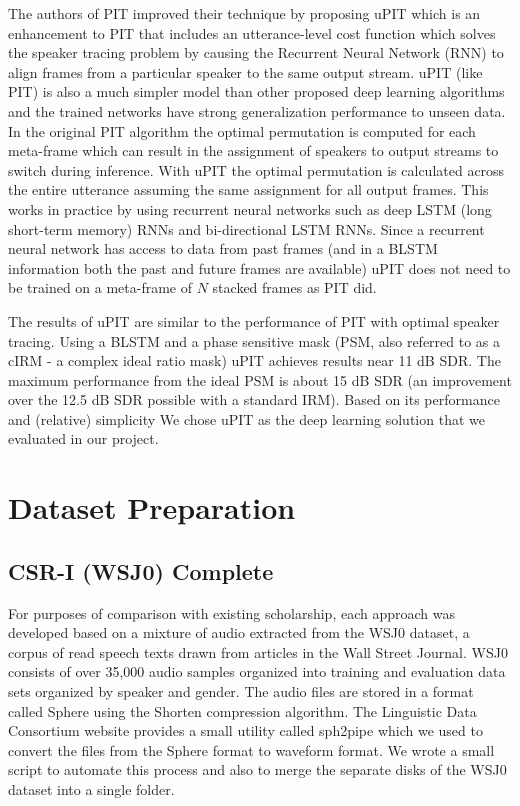 \documentclass[journal, a4paper]{IEEEtran}
\begin{document}
The authors of PIT improved their technique by proposing uPIT which is an enhancement to PIT that includes an utterance-level cost function which solves the speaker tracing problem by causing the Recurrent Neural Network (RNN) to align frames from a particular speaker to the same output stream. uPIT (like PIT) is also a much simpler model than other proposed deep learning algorithms and the trained networks have strong generalization performance to unseen data. In the original PIT algorithm the optimal permutation is computed for each meta-frame which can result in the assignment of speakers to output streams to switch during inference. With uPIT the optimal permutation is calculated across the entire utterance assuming the same assignment for all output frames. This works in practice by using recurrent neural networks such as deep LSTM (long short-term memory) RNNs and bi-directional LSTM RNNs. Since a recurrent neural network has access to data from past frames (and in a BLSTM information both the past and future frames are available) uPIT does not need to be trained on a meta-frame of $N$ stacked frames as PIT did.

The results of uPIT are similar to the performance of PIT with optimal speaker tracing. Using a BLSTM and a phase sensitive mask (PSM, also referred to as a cIRM - a complex ideal ratio mask) uPIT achieves results near 11 dB SDR. The maximum performance from the ideal PSM is about 15 dB SDR (an improvement over the 12.5 dB SDR possible with a standard IRM). Based on its performance and (relative) simplicity We chose uPIT as the deep learning solution that we evaluated in our project.


\section{Dataset Preparation}
\subsection{CSR-I (WSJ0) Complete}
For purposes of comparison with existing scholarship, each approach was developed based on a mixture of audio extracted from the WSJ0 dataset, a corpus of read speech texts drawn from articles in the Wall Street Journal. WSJ0 \cite{garofolo:wsj0} consists of over 35,000 audio samples organized into training and evaluation data sets organized by speaker and gender. The audio files are stored in a format called Sphere using the Shorten compression algorithm. The Linguistic Data Consortium website provides a small utility called sph2pipe \cite{ldc:sph2pipe} which we used to convert the files from the Sphere format to waveform format. We wrote a small script to automate this process and also to merge the separate disks of the WSJ0 dataset into a single folder.
\end{document}
